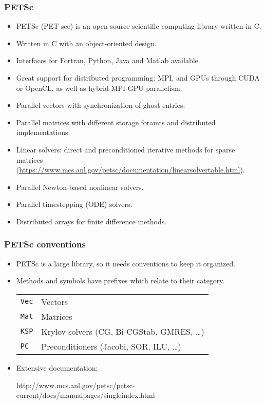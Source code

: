 \begin{frame}
  \frametitle{PETSc}
  \begin{itemize}
  \item PETSc (PET-see) is an open-source scientific computing library written
    in C.
  \item Written in C with an object-oriented design.
  \item Interfaces for Fortran, Python, Java and Matlab available.
  \item Great support for distributed programming: MPI, and GPUs through CUDA or OpenCL, as well as hybrid MPI-GPU parallelism. 
  \end{itemize}

\medskip
  \begin{itemize}
  \item Parallel vectors with synchronization of ghost entries.
  \item Parallel matrices with different storage foramts and distributed implementations.
  \item Linear solvers: direct and preconditioned iterative methods for sparse matrices (\href{list}{https://www.mcs.anl.gov/petsc/documentation/linearsolvertable.html}).
  \item Parallel Newton-based nonlinear solvers.
  \item Parallel timestepping (ODE) solvers.
  \item Distributed arrays for finite difference methods. 
  \end{itemize}

\end{frame}

\begin{frame}
  \frametitle{PETSc conventions}
  \begin{itemize}
  \item PETSc is a large library, so it needs conventions to keep it organized.
  \item Methods and symbols have prefixes which relate to their category.
  \vspace{2ex}
    \begin{tabular}{ll}
    \texttt{Vec} & Vectors \\
    \texttt{Mat} & Matrices \\
    \texttt{KSP} & Krylov solvers (CG, Bi-CGStab, GMRES, \dots)\\
    \texttt{PC}  & Preconditioners (Jacobi, SOR, ILU, \dots)\\
    \end{tabular}
\medskip
\item Extensive documentation:
\begin{center}
http://www.mcs.anl.gov/petsc/petsc-current/docs/manualpages/singleindex.html
\end{center}
  \end{itemize}
\end{frame}

